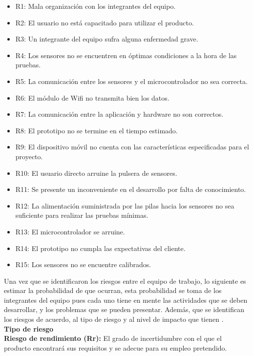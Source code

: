 \begin{itemize}
	\item R1: Mala organización con los integrantes del equipo.
	\item R2: El usuario no está capacitado para utilizar el producto.
	\item R3: Un integrante del equipo sufra alguna enfermedad grave.
	\item R4: Los sensores no se encuentren en óptimas condiciones a la hora de las pruebas.
	\item R5: La comunicación entre los sensores y el microcontrolador no sea correcta.
	\item R6: El módulo de Wifi no transmita bien los datos.
	\item R7: La comunicación entre la aplicación y hardware no son correctos.
	\item R8: El prototipo no se termine en el tiempo estimado.
	\item R9: El dispositivo móvil no cuenta con las características especificadas para el proyecto.
	\item R10: El usuario directo arruine la pulsera de sensores.
	\item R11: Se presente un inconveniente en el desarrollo por falta de conocimiento.
	\item R12: La alimentación suministrada por las pilas hacia los sensores no sea suficiente para realizar las pruebas mínimas.
	\item R13: El microcontrolador se arruine.
	\item R14: El prototipo no cumpla las expectativas del cliente.
	\item R15: Los sensores no se encuentre calibrados.
\end{itemize}

Una vez que se identificaron los riesgos entre el equipo de trabajo, lo siguiente es estimar la probabilidad de que ocurran, esta probabilidad se toma de los integrantes del equipo pues cada uno tiene en mente las actividades que se deben desarrollar, y los problemas que se pueden presentar. Además, que se identifican los riesgos de acuerdo, al tipo de riesgo y al nivel de impacto que tienen \cite{cuarentaycuatro}. \\

\textbf{Tipo de riesgo} \\

\textbf{Riesgo de rendimiento (Rr):} El grado de incertidumbre con el que el producto encontrará sus requisitos y se adecue para su empleo pretendido. \\

